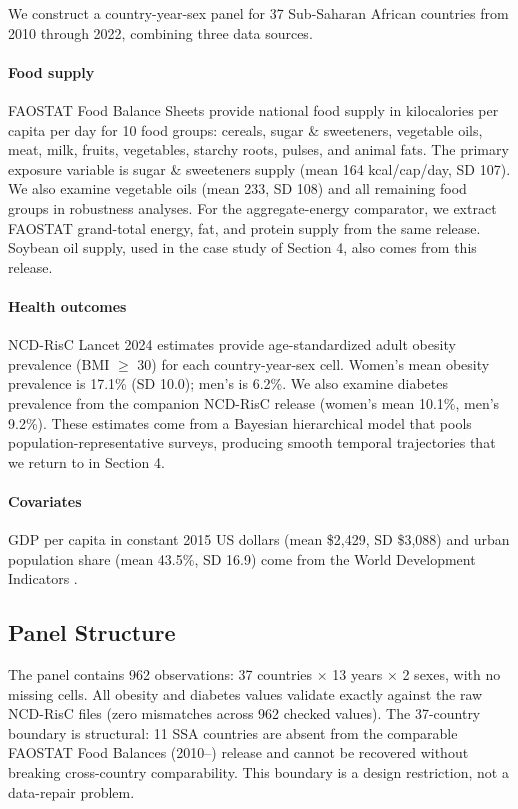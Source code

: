 \documentclass[letterpaper,11pt,leqno]{article}
\begin{document}
We construct a country-year-sex panel for 37 Sub-Saharan African countries from 2010 through 2022, combining three data sources.

\paragraph{Food supply} FAOSTAT Food Balance Sheets \citep{faostat2024} provide national food supply in kilocalories per capita per day for 10 food groups: cereals, sugar \& sweeteners, vegetable oils, meat, milk, fruits, vegetables, starchy roots, pulses, and animal fats. The primary exposure variable is sugar \& sweeteners supply (mean 164 kcal/cap/day, SD 107). We also examine vegetable oils (mean 233, SD 108) and all remaining food groups in robustness analyses. For the aggregate-energy comparator, we extract FAOSTAT grand-total energy, fat, and protein supply from the same release. Soybean oil supply, used in the case study of Section 4, also comes from this release.

\paragraph{Health outcomes} NCD-RisC Lancet 2024 estimates \citep{ncdrisc2024bmi} provide age-standardized adult obesity prevalence (BMI $\geq$ 30) for each country-year-sex cell. Women's mean obesity prevalence is 17.1\% (SD 10.0); men's is 6.2\%. We also examine diabetes prevalence from the companion NCD-RisC release \citep{ncdrisc2024diabetes} (women's mean 10.1\%, men's 9.2\%). These estimates come from a Bayesian hierarchical model that pools population-representative surveys, producing smooth temporal trajectories that we return to in Section 4.

\paragraph{Covariates} GDP per capita in constant 2015 US dollars (mean \$2,429, SD \$3,088) and urban population share (mean 43.5\%, SD 16.9) come from the World Development Indicators \citep{wdi2024}.

\subsection{Panel Structure}

The panel contains 962 observations: 37 countries $\times$ 13 years $\times$ 2 sexes, with no missing cells. All obesity and diabetes values validate exactly against the raw NCD-RisC files (zero mismatches across 962 checked values). The 37-country boundary is structural: 11 SSA countries are absent from the comparable FAOSTAT Food Balances (2010--) release and cannot be recovered without breaking cross-country comparability. This boundary is a design restriction, not a data-repair problem.
\end{document}

